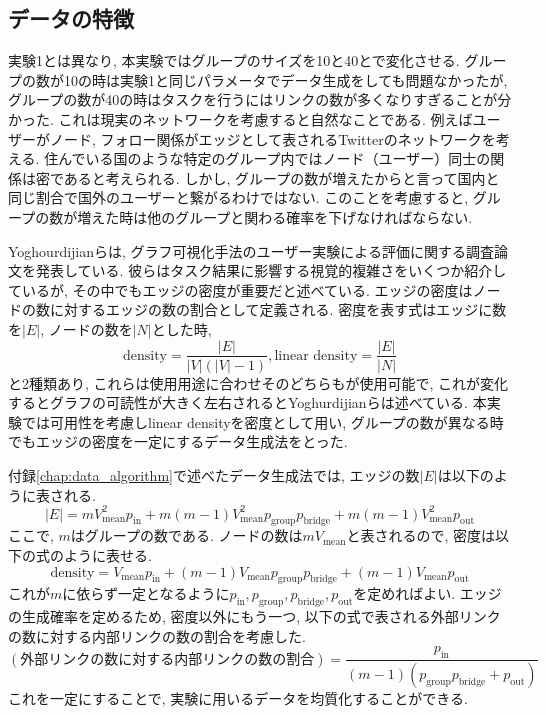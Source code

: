 \documentclass{kuee}
\begin{document}
\subsection{データの特徴}
\label{subsec:data_feature}
実験1とは異なり, 本実験ではグループのサイズを10と40とで変化させる.
グループの数が10の時は実験1と同じパラメータでデータ生成をしても問題なかったが, グループの数が40の時はタスクを行うにはリンクの数が多くなりすぎることが分かった.
これは現実のネットワークを考慮すると自然なことである.
例えばユーザーがノード, フォロー関係がエッジとして表されるTwitterのネットワークを考える.
住んでいる国のような特定のグループ内ではノード（ユーザー）同士の関係は密であると考えられる.
しかし, グループの数が増えたからと言って国内と同じ割合で国外のユーザーと繋がるわけではない.
このことを考慮すると, グループの数が増えた時は他のグループと関わる確率を下げなければならない.

Yoghourdijianらは, グラフ可視化手法のユーザー実験による評価に関する調査論文を発表している\cite{yoghourdjian2018exploring}.
彼らはタスク結果に影響する視覚的複雑さをいくつか紹介しているが, その中でもエッジの密度が重要だと述べている.
エッジの密度はノードの数に対するエッジの数の割合として定義される.
密度を表す式はエッジに数を$|E|$, ノードの数を$|N|$とした時,
\[
  \text{density} = \frac{|E|}{|V|(|V| - 1)},  \text{linear density} = \frac{|E|}{|N|}
 \]
と2種類あり, これらは使用用途に合わせそのどちらもが使用可能で, これが変化するとグラフの可読性が大きく左右されるとYoghurdijianらは述べている.
本実験では可用性を考慮しlinear densityを密度として用い, グループの数が異なる時でもエッジの密度を一定にするデータ生成法をとった.

付録\ref{chap:data_algorithm}で述べたデータ生成法では, エッジの数$|E|$は以下のように表される.
\[
  |E| = m V_{\text{mean}}^2 p_{\text{in}} + m(m-1) V_{\text{mean}}^2 p_{\text{group}} p_{\text{bridge}} + m(m-1) V_{\text{mean}}^2 p_{\text{out}}
\]
ここで, $m$はグループの数である.
ノードの数は$m V_{\text{mean}}$と表されるので, 密度は以下の式のように表せる.
\[
  \text{density} = V_{\text{mean}} p_{\text{in}} + (m-1) V_{\text{mean}} p_{\text{group}} p_{\text{bridge}} + (m-1) V_{\text{mean}} p_{\text{out}}
\]
これが$m$に依らず一定となるように$p_{\text{in}}, p_{\text{group}}, p_{\text{bridge}}, p_{\text{out}}$を定めればよい.
エッジの生成確率を定めるため, 密度以外にもう一つ, 以下の式で表される外部リンクの数に対する内部リンクの数の割合を考慮した.
\[
  (\text{外部リンクの数に対する内部リンクの数の割合}) = \frac{p_{\text{in}}}{(m-1) (p_{\text{group}} p_{\text{bridge}} + p_{\text{out}})}
\]
これを一定にすることで, 実験に用いるデータを均質化することができる.
\end{document}
